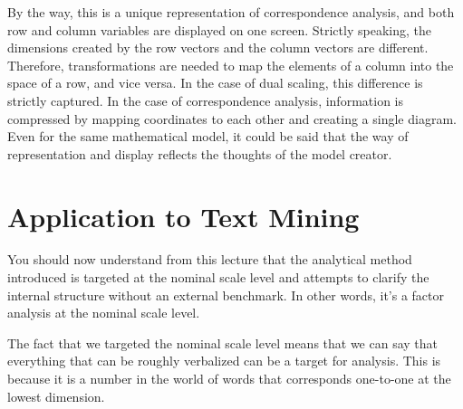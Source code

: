 \documentclass{ltjsbook}
\begin{document}
By the way, this is a unique representation of correspondence analysis, and both row and column variables are displayed on one screen.
Strictly speaking, the dimensions created by the row vectors and the column vectors are different. Therefore, transformations are needed to map the elements of a column into the space of a row, and vice versa.
In the case of dual scaling, this difference is strictly captured. In the case of correspondence analysis, information is compressed by mapping coordinates to each other and creating a single diagram.
Even for the same mathematical model, it could be said that the way of representation and display reflects the thoughts of the model creator.

\section{Application to Text Mining}
You should now understand from this lecture that the analytical method introduced is targeted at the nominal scale level and attempts to clarify the internal structure without an external benchmark. In other words, it's a factor analysis at the nominal scale level.

The fact that we targeted the nominal scale level means that we can say that everything that can be roughly verbalized can be a target for analysis. This is because it is a number in the world of words that corresponds one-to-one at the lowest dimension.
\end{document}
